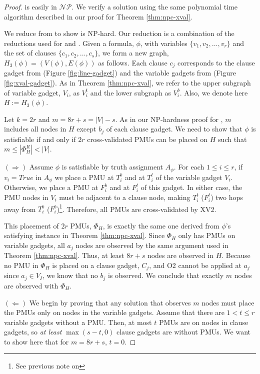 \begin{proof}
\xvalpart is easily in $\mathcal{NP}$. We verify a \xvalpart solution using the same polynomial time algorithm described in our proof
for Theorem \ref{thm:npc-xval}. %

We reduce from \sat to show \xvalpart is NP-hard. Our reduction is a combination
of the reductions used for \maxinc and \xvals. Given a \sat formula, $\phi$,
with variables $\{v_1,v_2, \dots , v_r\}$ and the set of clauses $\{c_1,c_2,
\dots , c_s \}$, we form a new graph, $H_3(\phi) = (V(\phi),E(\phi))$  as follows. Each clause $c_j$
corresponds to the clause gadget from \maxinc (Figure \ref{fig:line-gadget})
and the variable gadgets from \xval (Figure \ref{fig:xval-gadget}).
As in Theorem \ref{thm:npc-xval}, we refer to the upper subgraph of variable gadget, $V_i$,
as $V_{i}^t$ and the lower subgraph as $V_{i}^b$.  Also, we denote here $H:= H_3(\phi)$.

Let $k = 2r$ and $m = 8r + s = |V| - s$. As in our NP-hardness proof for \maxincs, $m$ includes all nodes in $H$
except $b_j$ of each clause gadget. We need to show that $\phi$ is satisfiable if and only if
$2r$ cross-validated PMUs can be placed on $H$ such that $m \leq |\Phi^R_{H}| < |V|$.

$(\Rightarrow)$ Assume $\phi$ is satisfiable by truth assignment $A_{\phi}$.
For each $1\leq i\leq r$, if $v_i=True$ in $A_{\phi}$ we place a PMU at $T_i^b$
and at $T_i^t$ of the variable gadget $V_i$. Otherwise, we place a PMU at $F_i^b$
and at $F_i^t$ of this gadget. In either case, the PMU nodes in $V_i$ must be
adjacent to a clause node, making $T_i^t$ ($F_i^t$) two hops away from
$T_i^b$ ($F_i^b$)\footnote{See previous note on \xval}. Therefore, all PMUs are cross-validated by XV2.

This placement of $2r$ PMUs, $\Phi_H$, is exactly the same one derived from $\phi$'s satisfying instance in Theorem \ref{thm:npc-xval}.
Since $\Phi_H$ only has PMUs on variable gadgets, all $a_j$ nodes are observed by the same argument used in Theorem \ref{thm:npc-xval}.
Thus, at least $8r + s$ nodes are observed in $H$.
Because no PMU in $\Phi_H$ is placed on a clause gadget, $C_j$, and O2 cannot be applied at $a_j$ since $a_j \in V_I$, we know that no $b_j$ is observed.
We conclude that exactly $m$ nodes are observed with $\Phi_H$.

$(\Leftarrow)$
We begin by proving that any solution that observes $m$ nodes must place the PMUs only on nodes in the variable gadgets. Assume that there are $1<t\leq r$ variable gadgets without a PMU.
Then, at most $t$ PMUs are on nodes in clause gadgets, so {\it at least} $\max(s-t,0)$ clause gadgets are without PMUs. We want to show here that for $m=8r+s$, $t=0$.


\end{proof}
